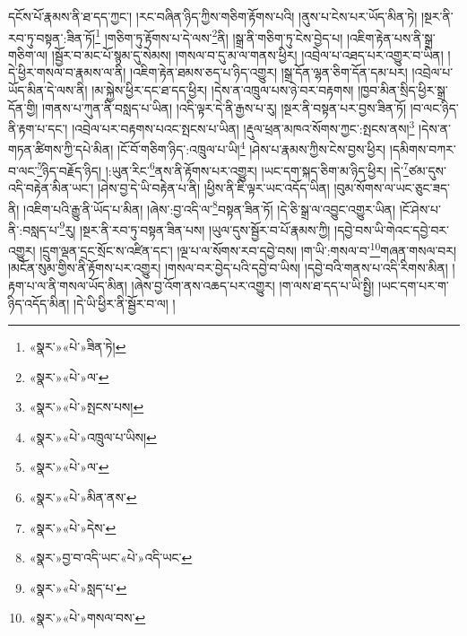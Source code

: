 དངོས་པོ་རྣམས་ནི་ཐ་དད་ཀྱང་། །རང་བཞིན་ཉིད་ཀྱིས་གཅིག་རྟོགས་པའི། །ནུས་པ་ངེས་པར་ཡོད་མིན་ཏེ། །སྔར་ནི་རབ་ཏུ་བསྟན་:ཟིན་ཏོ།\footnote{«སྣར་»«པེ་»ཟིན་ཏེ།} །གཅིག་ཏུ་རྟོགས་པ་དེ་ལས་\footnote{«སྣར་»«པེ་»ལ་}ནི། །སྒྲ་ནི་གཅིག་ཏུ་ངེས་བྱེད་པ། །འཇིག་རྟེན་པས་ནི་སྒྲ་གཅིག་ལ། །སྦྱོར་བ་མང་པོ་སྙམ་དུ་སེམས། །གསལ་བ་དུ་མ་ལ་གནས་ཕྱིར། །འབྲེལ་པ་འཐད་པར་འགྱུར་བ་ཡིན། །དེ་ཕྱིར་གསལ་བ་རྣམས་ལ་ནི། །འཇིག་རྟེན་ཐམས་ཅད་པ་ཉིད་འགྱུར། །སྒྲ་དོན་ལྷན་ཅིག་དོན་དམ་པར། །འབྲེལ་པ་ཡོད་མིན་དེ་ལས་ནི། །མ་སྐྱེས་ཕྱིར་དང་ཐ་དད་ཕྱིར། །དེས་ན་འཁྲུལ་པས་ཉེ་བར་བརྟགས། །ཁྱབ་མིན་སྲིད་ཕྱིར་སྒྲ་དོན་གྱི། །གནས་པ་ཀུན་ནི་བསླད་པ་ཡིན། །འདི་ལྟར་དེ་ནི་རྒྱས་པ་རུ། །སྔར་ནི་བསྟན་པར་བྱས་ཟིན་ཏོ། །བ་ལང་ཉིད་ནི་རྟག་པ་དང་། །འབྲེལ་པར་བརྟགས་པའང་སྤངས་པ་ཡིན། །རྡུལ་ཕྲན་མཁའ་སོགས་ཀྱང་:སྤངས་ནས།\footnote{«སྣར་»«པེ་»སྤངས་པས།} །དེས་ན་གཏན་ཚིགས་ཀྱི་དཔེ་མིན། །ངོ་བོ་གཅིག་ཉིད་:འཁྲུལ་པ་ཡི།\footnote{«སྣར་»«པེ་»འཁྲུལ་པ་ཡིས།} །ཤེས་པ་རྣམས་ཀྱིས་ངེས་བྱས་ཕྱིར། །དམིགས་བཀར་བ་ལང་\footnote{«སྣར་»«པེ་»ལ་}ཉིད་བརྗོད་ཉིད། །:ཡུན་རིང་\footnote{«སྣར་»«པེ་»མིན་ནས་}ནས་ནི་རྟོགས་པར་འགྱུར། །ཡང་དག་སྐད་ཅིག་མ་ཉིད་ཕྱིར། །དེ་\footnote{«སྣར་»«པེ་»དེས་}ཙམ་དུས་འདི་བརྟེན་མིན་ཡང་། །ཤེས་བྱ་དེ་ཡི་བརྟེན་པ་ནི། །ཕྱིས་ནི་ཇི་ལྟར་ཡང་འདོད་ཡིན། །བུམ་སོགས་ལ་ཡང་ཅུང་ཟད་ནི། །འཇིག་པའི་རྒྱུ་ནི་ཡོད་པ་མིན། །ཞེས་:བྱ་འདི་ལ་\footnote{«སྣར་»བྱ་བ་འདི་ཡང་«པེ་»འདི་ཡང་}བསྟན་ཟིན་ཏོ། །དེ་ཅི་སྒྲ་ལ་འབྱུང་འགྱུར་ཡིན། །ངོ་ཤེས་པ་ནི་:བསླད་པ་\footnote{«སྣར་»«པེ་»སླད་པ་}རུ། །སྔར་ནི་རབ་ཏུ་བསྟན་ཟིན་པས། །ཡུལ་དུས་སྦྱོར་བ་པོ་རྣམས་ཀྱི། །དབྱེ་བས་ཡི་གེའང་དབྱེ་བར་འགྱུར། །དྲུག་ལྡན་དྲང་སྲོང་ས་འཛིན་དང་། །ལྔ་པ་ལ་སོགས་རབ་དབྱེ་བས། །ག་ཡི་:གསལ་བ་\footnote{«སྣར་»«པེ་»གསལ་བས་}གཞན་གསལ་བར། །མངོན་སུམ་གྱིས་ནི་རྟོགས་པར་འགྱུར། །གསལ་བར་བྱེད་པའི་དབྱེ་བ་ཡིས། །དབྱེ་བའི་གནས་པ་འདི་རིགས་མིན། །རྟག་པ་ལ་ནི་གསལ་ཡོད་མིན། །ཞེས་བྱ་འོག་ནས་འཆད་པར་འགྱུར། །ག་ལས་ཐ་དད་པ་ཡི་སྤྱི། །ཡང་དག་པར་ག་ཉིད་འདོད་མིན། །དེ་ཡི་ཕྱིར་ནི་སྦྱོར་བ་ལ། །
